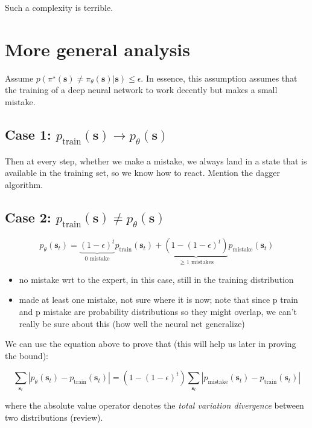 \documentclass{article}
\newcommand{\state}{\mathbf{s}}
\newcommand{\expert}{\pi^{\star}}
\begin{document}
Such a complexity is terrible. 

\section{More general analysis}

Assume $p(\expert(\state) \neq \pi_{\theta}(\state) | \state) \leq \epsilon$. In essence, this assumption assumes that the training of a deep neural network to work decently but makes a small mistake.

\subsection{Case 1: $p_{\text{train}}(\state) \to p_{\theta}(\state)$}

Then at every step, whether we make a mistake, we always land in a state that is available in the training set, so we know how to react. Mention the dagger algorithm.

\subsection{Case 2: $p_{\text{train}}(\state) \neq p_{\theta}(\state)$}

$$
p_{\theta}(\state_t) = 
\underbrace{(1-\epsilon)^t}_{\text{0 mistake}} p_{\text{train}} (\state_t) 
+ 
\underbrace{(1 - (1 - \epsilon)^t)}_{\geq 1 \text{ mistakes}} p_{\text{mistake}}(\state_t)
$$

\begin{itemize}
	\item no mistake wrt to the expert, in this case, still in the training distribution
	\item made at least one mistake, not sure where it is now; note that since p train and p mistake are probability distributions so they might overlap, we can't really be sure about this (how well the neural net generalize)
\end{itemize}

We can use the equation above to prove that (this will help us later in proving the bound):

$$
\sum_{\state_t} \left|p_{\theta}\left(\mathbf{s}_{t}\right)-p_{\text {train}}\left(\mathbf{s}_{t}\right)\right|=\left(1-(1-\epsilon)^{t}\right)
\sum_{\state_t}\left|p_{\text{mistake}}\left(\mathbf{s}_{t}\right)-p_{\text {train}}\left(\mathbf{s}_{t}\right)\right|
$$

where the absolute value operator denotes the \textit{total variation divergence} between two distributions (review).
\end{document}
